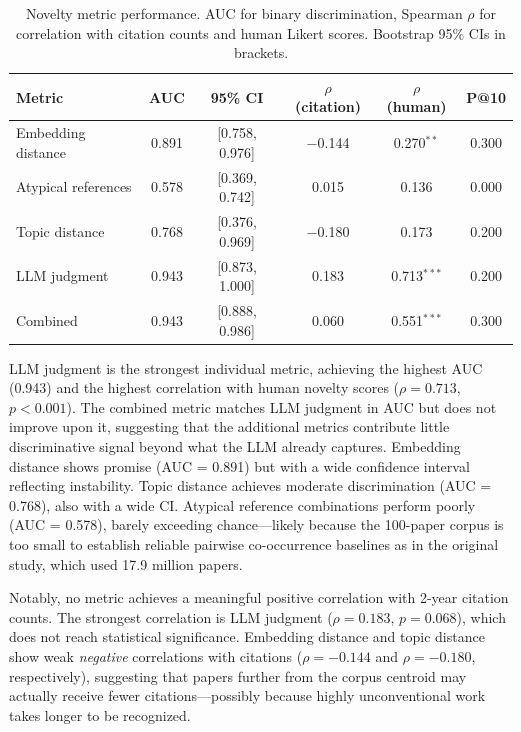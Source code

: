 \documentclass[11pt,a4paper]{article}
\begin{document}
\begin{table}[ht]
\centering
\caption{Novelty metric performance.  AUC for binary discrimination,
Spearman $\rho$ for correlation with citation counts and human Likert
scores.  Bootstrap 95\% CIs in brackets.}
\label{tab:metrics}
\begin{tabular}{lccccc}
\toprule
\textbf{Metric} & \textbf{AUC} & \textbf{95\% CI} &
  \textbf{$\rho$ (citation)} & \textbf{$\rho$ (human)} &
  \textbf{P@10} \\
\midrule
Embedding distance   & 0.891 & [0.758, 0.976] & $-$0.144 & 0.270$^{**}$  & 0.300 \\
Atypical references  & 0.578 & [0.369, 0.742] &    0.015 & 0.136         & 0.000 \\
Topic distance       & 0.768 & [0.376, 0.969] & $-$0.180 & 0.173         & 0.200 \\
LLM judgment         & 0.943 & [0.873, 1.000] &    0.183 & 0.713$^{***}$ & 0.200 \\
Combined             & 0.943 & [0.888, 0.986] &    0.060 & 0.551$^{***}$ & 0.300 \\
\bottomrule
\end{tabular}
\end{table}

LLM judgment is the strongest individual metric, achieving the highest
AUC (0.943) and the highest correlation with human novelty scores
($\rho = 0.713$, $p < 0.001$).  The combined metric matches LLM
judgment in AUC but does not improve upon it, suggesting that the
additional metrics contribute little discriminative signal beyond what
the LLM already captures.  Embedding distance shows promise
(AUC = 0.891) but with a wide confidence interval reflecting
instability.  Topic distance achieves moderate discrimination
(AUC = 0.768), also with a wide CI.  Atypical reference combinations
perform poorly (AUC = 0.578), barely exceeding chance---likely because
the 100-paper corpus is too small to establish reliable pairwise
co-occurrence baselines as in the original \citet{uzzi2013atypical}
study, which used 17.9 million papers.

Notably, no metric achieves a meaningful positive correlation with
2-year citation counts.  The strongest correlation is LLM judgment
($\rho = 0.183$, $p = 0.068$), which does not reach statistical
significance.  Embedding distance and topic distance show weak
\emph{negative} correlations with citations ($\rho = -0.144$ and
$\rho = -0.180$, respectively), suggesting that papers further from
the corpus centroid may actually receive fewer citations---possibly
because highly unconventional work takes longer to be recognized.
\end{document}
